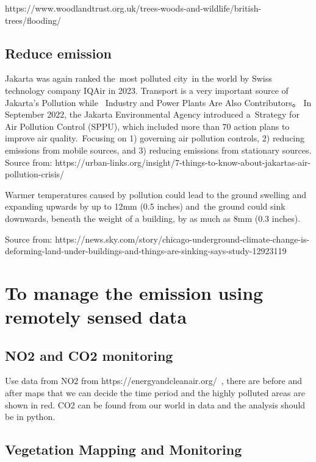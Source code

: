 \documentclass[
  letterpaper,
  DIV=11,
  numbers=noendperiod]{scrreprt}
\begin{document}
https://www.woodlandtrust.org.uk/trees-woods-and-wildlife/british-trees/flooding/

\section{Reduce emission}\label{reduce-emission}

Jakarta was again ranked the~most polluted city~in the world by Swiss
technology company IQAir in 2023. Transport is a very important source
of Jakarta's Pollution while ~Industry and Power Plants Are Also
Contributors。 In September 2022, the Jakarta Environmental Agency
introduced a~Strategy for Air Pollution Control (SPPU), which included
more than 70 action plans to improve air quality.~Focusing on 1)
governing air pollution controls, 2) reducing emissions from mobile
sources, and 3) reducing emissions from stationary sources. Source from:
https://urban-links.org/insight/7-things-to-know-about-jakartas-air-pollution-crisis/

Warmer temperatures caused by pollution could lead to the ground
swelling and expanding upwards by up to 12mm (0.5 inches) and~the ground
could sink downwards, beneath the weight of a building, by as much as
8mm (0.3 inches).

Source from:
https://news.sky.com/story/chicago-underground-climate-change-is-deforming-land-under-buildings-and-things-are-sinking-says-study-12923119


\chapter{To manage the emission using remotely sensed
data}\label{to-manage-the-emission-using-remotely-sensed-data}

\section{NO2 and CO2 monitoring}\label{no2-and-co2-monitoring}

Use data from NO2 from https://energyandcleanair.org/~, there are before
and after maps that we can decide the time period and the highly
polluted areas are shown in red. CO2 can be found from our world in data
and the analysis should be in python.

\section{Vegetation Mapping and
Monitoring}\label{vegetation-mapping-and-monitoring}
\end{document}
